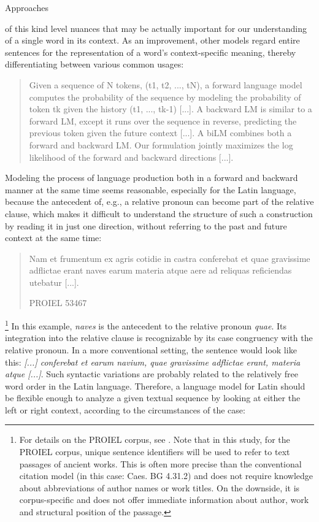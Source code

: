 \documentclass[jou]{apa6} %
\begin{document}
\hypertarget{ELMO}{Approaches} of this kind level nuances that may be actually important for our understanding of a single word in its context. As an improvement, other models regard entire sentences for the representation of a word's context-specific meaning, thereby differentiating between various common usages: 
\blockquote[{\cite[p.~2f.]{petersDeepContextualizedWord2018}}]{Given a sequence of N tokens, (t1, t2, ..., tN), a forward language model computes the probability of the sequence by modeling the probability of token tk given the history (t1, ..., tk-1) [...]. A backward LM is similar to a forward LM, except it runs over the sequence in reverse, predicting the previous token given the future context [...]. A biLM combines both a forward and backward LM. Our formulation jointly maximizes the log likelihood of the forward and backward directions [...].}
Modeling the process of language production both in a forward and backward manner at the same time seems reasonable, especially for the Latin language, because the antecedent of, e.g., a relative pronoun can become part of the relative clause, which makes it difficult to understand the structure of such a construction by reading it in just one direction, without referring to the past and future context at the same time:
\blockquote[{PROIEL 53467}]{Nam et frumentum ex agris cotidie in castra conferebat et quae gravissime adflictae erant naves earum materia atque aere ad reliquas reficiendas utebatur [...].}\footnote{For details on the PROIEL corpus, see \cite{haugCreatingParallelTreebank2008}. Note that in this study, for the PROIEL corpus, unique sentence identifiers will be used to refer to text passages of ancient works. This is often more precise than the conventional citation model (in this case: Caes. BG 4.31.2) and does not require knowledge about abbreviations of author names or work titles. On the downside, it is corpus-specific and does not offer immediate information about author, work and structural position of the passage.}
In this example, \textit{naves} is the antecedent to the relative pronoun \textit{quae}. Its integration into the relative clause is recognizable by its case congruency with the relative pronoun. In a more conventional setting, the sentence would look like this: \textit{[...] conferebat et earum navium, quae gravissime adflictae erant, materia atque [...]}. Such syntactic variations are probably related to the relatively free word order in the Latin language. Therefore, a language model for Latin should be flexible enough to analyze a given textual sequence by looking at either the left or right context, according to the circumstances of the case:
\end{document}
